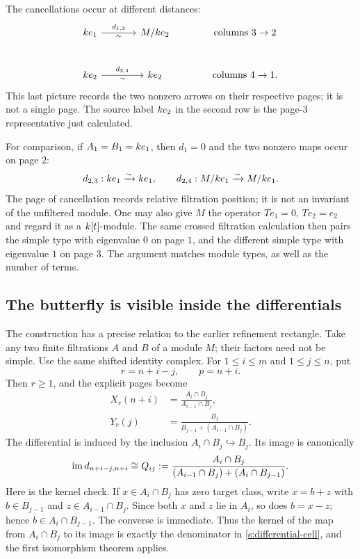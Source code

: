 The cancellations occur at different distances:
\[
\begin{tikzcd}[column sep=large,row sep=large]
\kk e_1\arrow[r,"d_{1,3}","\sim"']&M/\kk e_2
&\text{columns }3\to2\\
\kk e_2\arrow[r,"d_{3,4}","\sim"']&\kk e_2
&\text{columns }4\to1.
\end{tikzcd}
\]
This last picture records the two nonzero arrows on their respective
pages; it is not a single page. The source label $k e_2$ in the second row
is the page-$3$ representative just calculated.

For comparison, if $A_1=B_1=k e_1$, then $d_1=0$ and the two nonzero
maps occur on page $2$:
\[
d_{2,3}:k e_1\xrightarrow{\sim}k e_1,
\qquad
d_{2,4}:M/k e_1\xrightarrow{\sim} M/k e_1.
\]
The page of cancellation records relative filtration position; it is not
an invariant of the unfiltered module. One may also give $M$ the operator
$Te_1=0$, $Te_2=e_2$ and regard it as a $k[t]$-module. The same crossed
filtration calculation then pairs the simple type with eigenvalue $0$
on page $1$, and the different simple type with eigenvalue $1$ on page
$3$. The argument matches module types, as well as the number of terms.

\subsection{The butterfly is visible inside the differentials}

The construction has a precise relation to the earlier refinement
rectangle. Take any two finite filtrations $A$ and $B$ of a module $M$;
their factors need not be simple. Use the same shifted identity complex.
For $1\leq i\leq m$ and $1\leq j\leq n$, put
\[
r=n+i-j,\qquad p=n+i.
\]
Then $r\geq1$, and the explicit pages become
\begin{align*}
X_r(n+i)&=\frac{A_i\cap B_j}{A_{i-1}\cap B_j},\\
Y_r(j)&=\frac{B_j}{B_{j-1}+(A_{i-1}\cap B_j)}.
\end{align*}
The differential is induced by the inclusion $A_i\cap B_j\hookrightarrow
B_j$. Its image is canonically
\begin{equation}\label{s:differential-cell}
\operatorname{im} d_{n+i-j,n+i}\cong
Q_{ij}:=
\frac{A_i\cap B_j}
{(A_{i-1}\cap B_j)+(A_i\cap B_{j-1})}.
\end{equation}
Here is the kernel check. If $x\in A_i\cap B_j$ has zero target class,
write $x=b+z$ with $b\in B_{j-1}$ and $z\in A_{i-1}\cap B_j$.
Since both $x$ and $z$ lie in $A_i$, so does $b=x-z$; hence
$b\in A_i\cap B_{j-1}$. The converse is immediate. Thus the kernel of
the map from $A_i\cap B_j$ to its image is exactly the denominator
in \eqref{s:differential-cell}, and the first isomorphism theorem applies.

